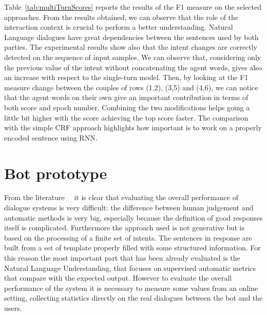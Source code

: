 Table~\ref{tab:multiTurnScores} reports the results of the F1 measure on the selected approaches. From the results obtained, we can observe that the role of the interaction context is crucial to perform a better understanding. Natural Language dialogues have great dependencies between the sentences used by both parties. The experimental results show also that the intent changes are correctly detected on the sequence of input samples. We can observe that, considering only the previous value of the intent without concatenating the agent words, gives also an increase with respect to the single-turn model. Then, by looking at the F1 measure change between the couples of rows (1,2), (3,5) and (4,6), we can notice that the agent words on their own give an important contribution in terms of both score and epoch number. Combining the two  modifications helps going a little bit higher with the score achieving the top score faster. The comparison with the simple CRF approach highlights how important is to work on a properly encoded sentence using RNN.

\section{Bot prototype}
\label{validationPrototype}

From the literature~\cite{liu2016not}~\cite{li2015diversity} it is clear that evaluating the overall performance of dialogue systems is very difficult: the difference between human judgement and automatic methods is very big, especially because the definition of good responses itself is complicated. Furthermore the approach used is not generative but is based on the processing of a finite set of intents. The sentences in response are built from a set of template properly filled with some structured information. For this reason the most important part that has been already evaluated is the Natural Language Understanding, that focuses on supervised automatic metrics that compare with the expected output. However to evaluate the overall performance of the system it is necessary to measure some values from an online setting, collecting statistics directly on the real dialogues between the bot and the users.

